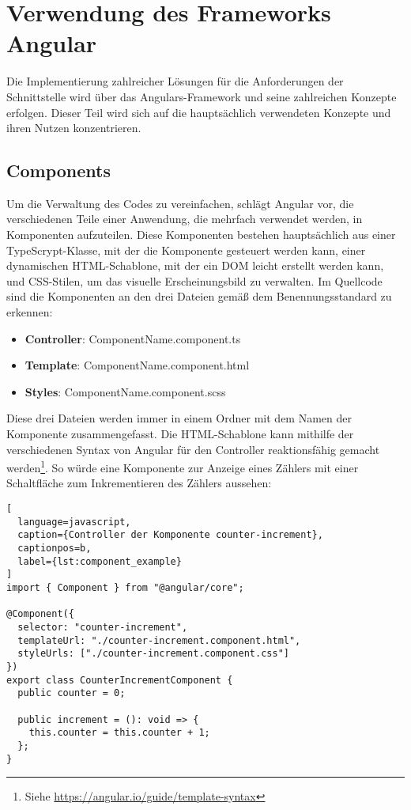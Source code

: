\section{Verwendung des Frameworks Angular}

Die Implementierung zahlreicher Lösungen für die Anforderungen der Schnittstelle wird über das Angulars-Framework und seine zahlreichen Konzepte erfolgen.
Dieser Teil wird sich auf die hauptsächlich verwendeten Konzepte und ihren Nutzen konzentrieren.

\subsection{Components}

Um die Verwaltung des Codes zu vereinfachen, schlägt Angular vor, die verschiedenen Teile einer Anwendung, die mehrfach verwendet werden, in Komponenten aufzuteilen.
Diese Komponenten bestehen hauptsächlich aus einer TypeScrypt-Klasse, mit der die Komponente gesteuert werden kann, einer dynamischen HTML-Schablone, mit der ein \ac{DOM} leicht erstellt werden kann, und CSS-Stilen, um das visuelle Erscheinungsbild zu verwalten.
Im Quellcode sind die Komponenten an den drei Dateien gemäß dem Benennungsstandard zu erkennen:

\begin{itemize}
  \item \textbf{Controller}: ComponentName.component.ts
  \item \textbf{Template}: ComponentName.component.html
  \item \textbf{Styles}: ComponentName.component.scss
\end{itemize}

Diese drei Dateien werden immer in einem Ordner mit dem Namen der Komponente zusammengefasst.
Die HTML-Schablone kann mithilfe der verschiedenen Syntax von Angular für den Controller reaktionsfähig gemacht werden\footnote{Siehe \href{https://angular.io/guide/template-syntax}{https://angular.io/guide/template-syntax}}.
So würde eine Komponente zur Anzeige eines Zählers mit einer Schaltfläche zum Inkrementieren des Zählers aussehen:

\begin{lstlisting}[
  language=javascript,
  caption={Controller der Komponente counter-increment},
  captionpos=b,
  label={lst:component_example}
]
import { Component } from "@angular/core";

@Component({
  selector: "counter-increment",
  templateUrl: "./counter-increment.component.html",
  styleUrls: ["./counter-increment.component.css"]
})
export class CounterIncrementComponent {
  public counter = 0;

  public increment = (): void => {
    this.counter = this.counter + 1;
  };
}
\end{lstlisting}


